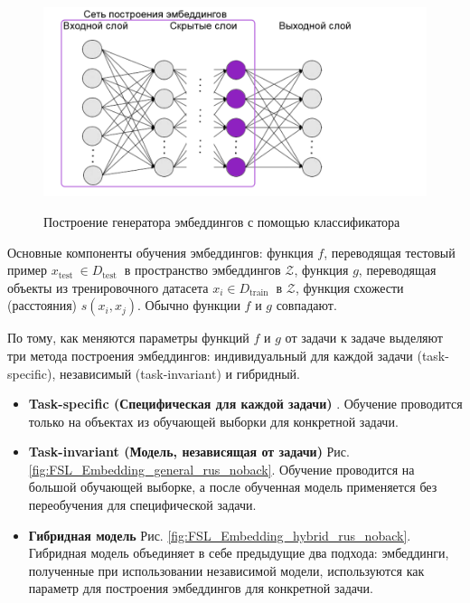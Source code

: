 \begin{figure}[!h]
\caption{Построение генератора эмбеддингов с помощью классификатора}
\centering
\includegraphics[width=16cm]{Images/embed_from_mlp.png}
\label{fig:embed_from_mlp}
\end{figure}


    Основные компоненты обучения эмбеддингов: функция $f$, переводящая тестовый пример $x_{\text {test }} \in D_{\text {test }}$ в пространство эмбеддингов $\mathcal{Z}$, функция $g$, переводящая объекты из тренировочного датасета $x_i \in D_{\text {train }}$ в $\mathcal{Z}$, функция схожести (расстояния) $s(x_i, x_j)$. Обычно функции $f$ и $g$ совпадают.

    По тому, как меняются параметры функций $f$ и $g$ от задачи к задаче выделяют три метода построения эмбеддингов: индивидуальный для каждой задачи (task-specific), независимый (task-invariant) и гибридный.

\begin{itemize}
    \item \textbf{Task-specific (Специфическая для каждой задачи)} \cite{ReviewEmbedInformationLens}. Обучение проводится только на объектах из обучающей выборки для конкретной задачи. 
    \item \textbf{Task-invariant (Модель, независящая от задачи)} \cite{ReviewEmbedObjectClassification, ReviewSiameseNeuralNetworks} Рис. \ref{fig:FSL_Embedding_general_rus_noback}. Обучение проводится на большой обучающей выборке, а после обученная модель применяется без переобучения для специфической задачи.
    \label{pos:TaskInvariant}
    \item \textbf{Гибридная модель} \cite{ReviewEmbedFeedForward} Рис. \ref{fig:FSL_Embedding_hybrid_rus_noback}. Гибридная модель объединяет в себе предыдущие два подхода: эмбеддинги, полученные при использовании независимой модели, используются как параметр для построения эмбеддингов для конкретной задачи.
\end{itemize}

